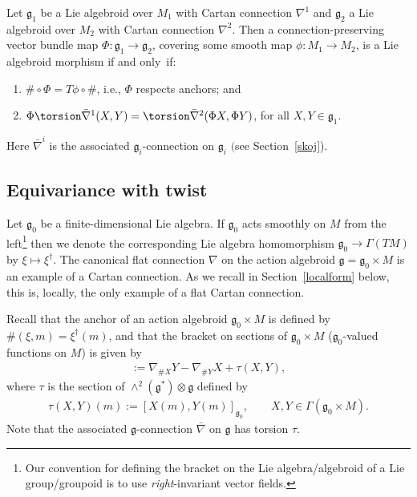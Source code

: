 \begin{PropositionBlaom}\label{Proposition2.1}
  Let ${\mathfrak g}_1$ be a Lie algebroid over $M_1$ with Cartan
  connection $\nabla^1$ and ${\mathfrak g}_2$ a Lie algebroid over
  $M_2$ with Cartan connection $\nabla^2$. Then a
  connection-preserving vector bundle map $\Phi \colon {\mathfrak g}_1
  \rightarrow {\mathfrak g}_2 $, covering some smooth map $\phi \colon
  M_1 \rightarrow M_2$, is a Lie algebroid morphism if and only~if:
  \begin{enumerate}\itemsep=0pt
  \item[$(1)$] $\# \circ \Phi =T\phi \circ \# $, i.e., $\Phi$ respects
    anchors; and
  \item[$(2)$] $\Phi \torsion \bar \nabla^1 (X,Y)=\torsion \bar\nabla^2(\Phi
    X, \Phi Y) $, for all $X,Y\in{\mathfrak g}_1$.
  \end{enumerate}
  Here $\bar \nabla ^i$ is the associated ${\mathfrak g}_i$-connection
  on ${\mathfrak g}_i$ $($see Section~{\rm \ref{skoj})}.
\end{PropositionBlaom}

\subsection{Equivariance with twist}\label{morph2}

Let ${\mathfrak g}_0$ be a f\/inite-dimensional Lie algebra. If
${\mathfrak g}_0$ acts smoothly on $M$ from the left\footnote{Our
  convention for def\/ining the bracket on the Lie algebra/algebroid of
  a Lie group/groupoid is to use {\em right}-invariant vector f\/ields.}
then we denote the corresponding Lie algebra homomorphism ${\mathfrak
  g}_0 \rightarrow \Gamma(TM)$ by $\xi \mapsto \xi^\dagger$. The
canonical f\/lat connection $\nabla$ on the action algebroid ${\mathfrak
  g}={\mathfrak g}_0 \times M$ is an example of a Cartan
connection. As we recall in Section~\ref{localform} below, this is, locally, the
only example of a f\/lat Cartan connection.

Recall that the anchor of an action algebroid ${\mathfrak g}_0 \times
M$ is def\/ined by $\#(\xi,m)=\xi^\dagger(m)$, and that the bracket on
sections of ${\mathfrak g}_0 \times M$ (${\mathfrak g}_0$-valued
functions on $M$) is given by
\begin{gather}
  [ X, Y]:=\nabla_{\#X}Y-\nabla_{\#Y}X+\tau (X,Y),\label{qwq}
\end{gather}
where $\tau$ is the section of $\wedge^2({\mathfrak g}^*)\otimes
{\mathfrak g} $ def\/ined by
\begin{gather*}
        \tau (X, Y)(m):=[X(m), Y(m)]_{{\mathfrak g}_0},\qquad
        X,Y\in\Gamma(\mathfrak g_0\times M).
\end{gather*}
Note that the associated ${\mathfrak g}$-connection $\bar\nabla$ on
${\mathfrak g}$ has torsion $\tau$.

